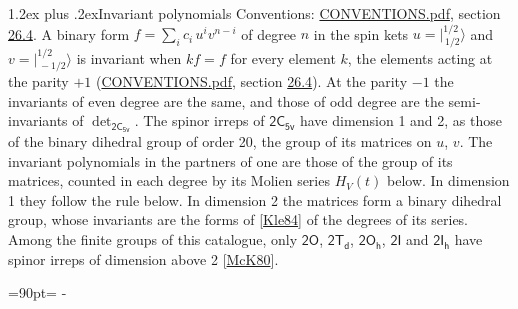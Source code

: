 \documentclass[10pt,a4paper]{article}
\makeatletter
\renewcommand\section{\@startsection{section}{1}{\z@}{-3ex plus -1ex minus -.2ex}%
  {1.2ex plus .2ex}{\normalfont\large\sffamily\bfseries\color{parttitle}}}
\newcommand{\needspace}[1]{\par\penalty-100\begingroup\dimen0=#1\relax\dimen2=\pagegoal
  \advance\dimen2-\pagetotal\ifdim\dimen0>\dimen2\relax\ifdim\dimen2>0pt\vfil\break\fi\fi
  \endgroup}
\numberwithin{equation}{section}
\newcommand{\grp}[1]{\mathsf{#1}}
\newcommand{\jm}[2]{\bigl\lvert{}^{#1}_{\,#2}\bigr\rangle}
\makeatother
\begin{document}
\section{Invariant polynomials}\label{s:invariants}
Conventions: \href{../../CONVENTIONS.pdf}{CONVENTIONS.pdf}, section \href{../../CONVENTIONS.pdf\#conv.26.4}{26.4}.
\leavevmode\label{n:local.binary.form}A binary form $f = \sum_i c_i\, u^i v^{n-i}$ of degree $n$ in the spin kets $u = \jm{1/2}{1/2}$ and $v = \jm{1/2}{-1/2}$ is invariant when $k f = f$ for every element $k$, the elements acting at the parity $+1$ (\href{../../CONVENTIONS.pdf}{CONVENTIONS.pdf}, section \href{../../CONVENTIONS.pdf\#conv.26.4}{26.4}). At the parity $-1$ the invariants of even degree are the same, and those of odd degree are the semi-invariants of $\det_{\grp{2C_{5v}}}$.
The spinor irreps of $\grp{2C_{5v}}$ have dimension 1 and 2, as those of the binary dihedral group of order 20, the group of its matrices on $u$, $v$. \label{n:function.hilbert}The invariant polynomials in the partners of one are those of the group of its matrices, counted in each degree by its Molien series $H_V(t)$ below. In dimension 1 they follow the rule below. In dimension 2 the matrices form a binary dihedral group, whose invariants are the forms of [\href{../../../REFERENCES.pdf\#ref.Kle84}{Kle84}] of the degrees of its series. Among the finite groups of this catalogue, only $\grp{2O}$, $\grp{2T_{d}}$, $\grp{2O_{h}}$, $\grp{2I}$ and $\grp{2I_{h}}$ have spinor irreps of dimension above 2 [\href{../../../REFERENCES.pdf\#ref.McK80}{McK80}].
\needspace{90pt}
\end{document}
